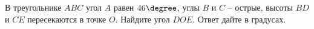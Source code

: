 \begin{ex}
	\begin{condition}
		В треугольнике \( ABC \) угол \( A \) равен \( 46\degree \), углы \( B \) и \( C \) – острые, высоты \( BD \) и \( CE \) пересекаются в точке \( O \). Найдите угол \( DOE \). Ответ дайте в градусах.
	\end{condition}
\end{ex}
